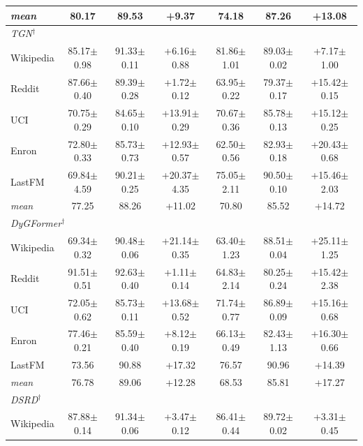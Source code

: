 \begin{table}[t]
\begin{tabular}{lcccccc}
\textit{mean} & 80.17 & 89.53 & +9.37 & 74.18 & 87.26 & +13.08 \\
\midrule
\multicolumn{7}{l}{\textit{TGN$^\dagger$}} \\
Wikipedia & 85.17{\tiny$\pm$0.98} & 91.33{\tiny$\pm$0.11} & +6.16{\tiny$\pm$0.88} & 81.86{\tiny$\pm$1.01} & 89.03{\tiny$\pm$0.02} & +7.17{\tiny$\pm$1.00} \\
Reddit & 87.66{\tiny$\pm$0.40} & 89.39{\tiny$\pm$0.28} & +1.72{\tiny$\pm$0.12} & 63.95{\tiny$\pm$0.22} & 79.37{\tiny$\pm$0.17} & +15.42{\tiny$\pm$0.15} \\
UCI & 70.75{\tiny$\pm$0.29} & 84.65{\tiny$\pm$0.10} & +13.91{\tiny$\pm$0.29} & 70.67{\tiny$\pm$0.36} & 85.78{\tiny$\pm$0.13} & +15.12{\tiny$\pm$0.25} \\
Enron & 72.80{\tiny$\pm$0.33} & 85.73{\tiny$\pm$0.73} & +12.93{\tiny$\pm$0.57} & 62.50{\tiny$\pm$0.56} & 82.93{\tiny$\pm$0.18} & +20.43{\tiny$\pm$0.68} \\
LastFM & 69.84{\tiny$\pm$4.59} & 90.21{\tiny$\pm$0.25} & +20.37{\tiny$\pm$4.35} & 75.05{\tiny$\pm$2.11} & 90.50{\tiny$\pm$0.10} & +15.46{\tiny$\pm$2.03} \\
\textit{mean} & 77.25 & 88.26 & +11.02 & 70.80 & 85.52 & +14.72 \\
\midrule
\multicolumn{7}{l}{\textit{DyGFormer$^\dagger$}} \\
Wikipedia & 69.34{\tiny$\pm$0.32} & 90.48{\tiny$\pm$0.06} & +21.14{\tiny$\pm$0.35} & 63.40{\tiny$\pm$1.23} & 88.51{\tiny$\pm$0.04} & +25.11{\tiny$\pm$1.25} \\
Reddit & 91.51{\tiny$\pm$0.51} & 92.63{\tiny$\pm$0.40} & +1.11{\tiny$\pm$0.14} & 64.83{\tiny$\pm$2.14} & 80.25{\tiny$\pm$0.24} & +15.42{\tiny$\pm$2.38} \\
UCI & 72.05{\tiny$\pm$0.62} & 85.73{\tiny$\pm$0.11} & +13.68{\tiny$\pm$0.52} & 71.74{\tiny$\pm$0.77} & 86.89{\tiny$\pm$0.09} & +15.16{\tiny$\pm$0.68} \\
Enron & 77.46{\tiny$\pm$0.21} & 85.59{\tiny$\pm$0.40} & +8.12{\tiny$\pm$0.19} & 66.13{\tiny$\pm$0.49} & 82.43{\tiny$\pm$1.13} & +16.30{\tiny$\pm$0.66} \\
LastFM & 73.56 & 90.88 & +17.32 & 76.57 & 90.96 & +14.39 \\
\textit{mean} & 76.78 & 89.06 & +12.28 & 68.53 & 85.81 & +17.27 \\
\midrule
\multicolumn{7}{l}{\textit{DSRD$^\dagger$}} \\
Wikipedia & 87.88{\tiny$\pm$0.14} & 91.34{\tiny$\pm$0.06} & +3.47{\tiny$\pm$0.12} & 86.41{\tiny$\pm$0.44} & 89.72{\tiny$\pm$0.02} & +3.31{\tiny$\pm$0.45} \\

\end{tabular}
\end{table}
